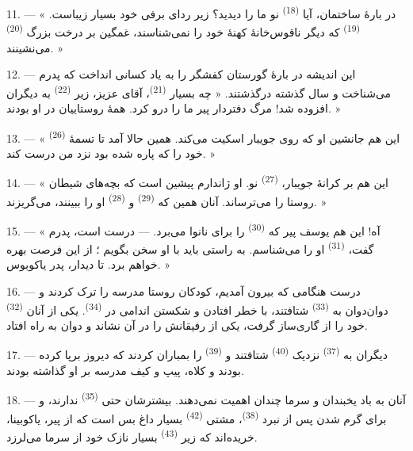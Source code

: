 11. --- « در بارهٔ ساختمان، آیا  \textsuperscript{(18)}
نو ما را دیدید؟ زیر ردای برفی خود بسیار زیباست. 
\textsuperscript{(19)} که دیگر ناقوس‌خانهٔ کهنهٔ خود را نمی‌شناسند،
غمگین بر درخت بزرگ  \textsuperscript{(20)}
می‌نشینند. »

12. --- این اندیشه در بارهٔ گورستان کفشگر را به یاد کسانی انداخت که
پدرم می‌شناخت و سال گذشته درگذشتند. « چه بسیار 
\textsuperscript{(21)}، آقای عزیز، زیر 
\textsuperscript{(22)} به دیگران افزوده شد! مرگ دفتردار پیر ما را درو
کرد. همهٔ روستاییان در  او بودند. »

13. --- « این هم جانشین او که روی جویبار اسکیت می‌کند. همین حالا آمد تا
تسمهٔ  \textsuperscript{(26)} خود را که پاره شده بود نزد
من درست کند. »

14. --- « این هم بر کرانهٔ جویبار، 
\textsuperscript{(27)} نو. او ژاندارم پیشین است که بچه‌های شیطان روستا
را می‌ترساند. آنان همین که  \textsuperscript{(29)} و
 \textsuperscript{(28)} او را ببینند، می‌گریزند. »

15. --- « آه! این هم یوسف پیر که 
\textsuperscript{(30)} را برای نانوا می‌برد. --- درست است، پدرم گفت،
 \textsuperscript{(31)} او را می‌شناسم. به راستی باید با
او سخن بگویم ؛ از این فرصت بهره خواهم برد. تا دیدار، پدر یاکوبوس. »

16. --- درست هنگامی که بیرون آمدیم، کودکان روستا مدرسه را ترک کردند و
دوان‌دوان به  \textsuperscript{(33)} شتافتند، با خطر
افتادن و شکستن اندامی در  \textsuperscript{(34)}.
یکی از آنان  \textsuperscript{(32)} خود را از گاری‌ساز
گرفت، یکی از رفیقانش را در آن نشاند و دوان به راه افتاد.

17. --- دیگران به  \textsuperscript{(37)} نزدیک
 \textsuperscript{(40)} شتافتند و 
\textsuperscript{(39)} را بمباران کردند که دیروز برپا کرده بودند و کلاه،
پیپ و کیف مدرسه بر او گذاشته بودند.

18. --- آنان به باد یخبندان و سرما چندان اهمیت نمی‌دهند. بیشترشان حتی
 \textsuperscript{(35)} ندارند، و برای گرم شدن پس از
نبرد  \textsuperscript{(38)}، مشتی 
\textsuperscript{(42)} بسیار داغ بس است که از  پیر،
یاکوبینا، خریده‌اند که زیر  \textsuperscript{(43)} بسیار
نازک خود از سرما می‌لرزد.

